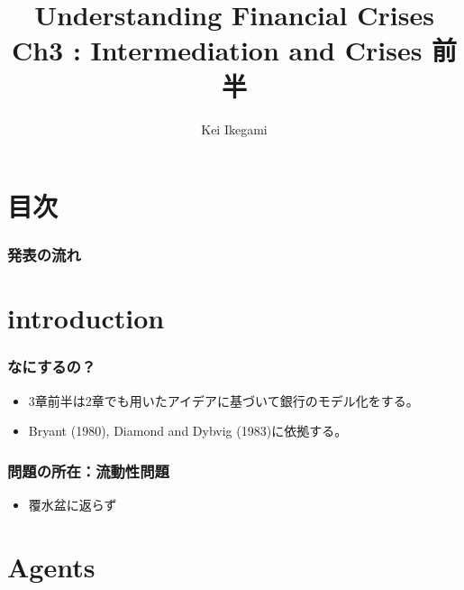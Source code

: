\documentclass[dvipdfmx, 12pt]{beamer}
\title{Understanding Financial Crises\\Ch3 : Intermediation and Crises 前半}
\author{Kei Ikegami}
\begin{document}
\newcommand{\argmin}{\mathop{\rm arg~min}\limits}

\frame{\maketitle}

\section*{目次}
\begin{frame} \frametitle{発表の流れ}
\tableofcontents
\end{frame}

\section{introduction}
\begin{frame}\frametitle{なにするの？}
	\begin{itemize}
		\item 3章前半は2章でも用いたアイデアに基づいて銀行のモデル化をする。
		\item Bryant (1980), Diamond and Dybvig (1983)に依拠する。
	\end{itemize}
\end{frame}
\begin{frame}\frametitle{問題の所在：流動性問題}
	\begin{itemize}
		\item 覆水盆に返らず
	\end{itemize}
\end{frame}


\section{Agents}
\end{document}
